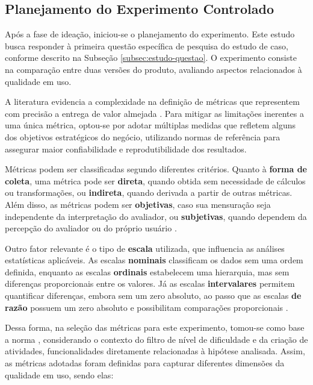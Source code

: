 \subsection{Planejamento do Experimento Controlado}
\label{subsec:plan_exp}

Após a fase de ideação, iniciou-se o planejamento do experimento. Este estudo busca responder à primeira questão específica de pesquisa do estudo de caso, conforme descrito na Subseção \ref{subsec:estudo-questao}. O experimento consiste na comparação entre duas versões do produto, avaliando aspectos relacionados à qualidade em uso.

A literatura evidencia a complexidade na definição de métricas que representem com precisão a entrega de valor almejada \cite{crook_seven_2009, larsen_statistical_2024}. Para mitigar as limitações inerentes a uma única métrica, optou-se por adotar múltiplas medidas que refletem alguns dos objetivos estratégicos do negócio, utilizando normas de referência para assegurar maior confiabilidade e reprodutibilidade dos resultados.

Métricas podem ser classificadas segundo diferentes critérios. Quanto à \textbf{forma de coleta}, uma métrica pode ser \textbf{direta}, quando obtida sem necessidade de cálculos ou transformações, ou \textbf{indireta}, quando derivada a partir de outras métricas. Além disso, as métricas podem ser \textbf{objetivas}, caso sua mensuração seja independente da interpretação do avaliador, ou \textbf{subjetivas}, quando dependem da percepção do avaliador ou do próprio usuário \cite{wohlin_experimentation_2012}.

Outro fator relevante é o tipo de \textbf{escala} utilizada, que influencia as análises estatísticas aplicáveis. As escalas \textbf{nominais} classificam os dados sem uma ordem definida, enquanto as escalas \textbf{ordinais} estabelecem uma hierarquia, mas sem diferenças proporcionais entre os valores. Já as escalas \textbf{intervalares} permitem quantificar diferenças, embora sem um zero absoluto, ao passo que as escalas \textbf{de razão} possuem um zero absoluto e possibilitam comparações proporcionais \cite{wohlin_experimentation_2012}.

Dessa forma, na seleção das métricas para este experimento, tomou-se como base a norma , considerando o contexto do filtro de nível de dificuldade e da criação de atividades, funcionalidades diretamente relacionadas à hipótese analisada. Assim, as métricas adotadas foram definidas para capturar diferentes dimensões da qualidade em uso, sendo elas:

